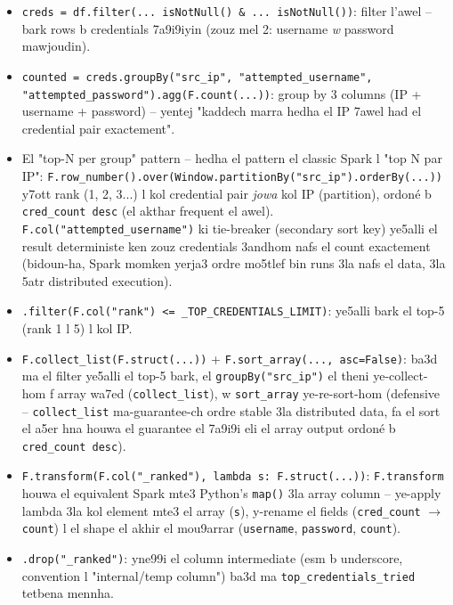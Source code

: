 \documentclass[11pt,a4paper]{report}
\DeclareRobustCommand{\code}[1]{\texttt{#1}}
\begin{document}
\begin{itemize}
  \item \code{creds = df.filter(... isNotNull() \& ... isNotNull())}:
        filter l'awel -- bark rows b credentials 7a9i9iyin (zouz mel 2:
        username \emph{w} password mawjoudin).
  \item \code{counted = creds.groupBy("src\_ip", "attempted\_username",
        "attempted\_password").agg(F.count(...))}: group by 3 columns
        (IP + username + password) -- yentej "kaddech marra hedha el IP
        7awel had el credential pair exactement".
  \item El "top-N per group" pattern -- hedha el pattern el classic Spark
        l "top N par IP": \code{F.row\_number().over(Window.partitionBy("src\_ip").orderBy(...))}
        y7ott rank (1, 2, 3...) l kol credential pair \emph{jowa} kol IP
        (partition), ordoné b \code{cred\_count desc} (el akthar frequent
        el awel). \code{F.col("attempted\_username")} ki tie-breaker
        (secondary sort key) ye5alli el result deterministe ken zouz
        credentials 3andhom nafs el count exactement (bidoun-ha, Spark
        momken yerja3 ordre mo5tlef bin runs 3la nafs el data, 3la 5atr
        distributed execution).
  \item \code{.filter(F.col("rank") <= \_TOP\_CREDENTIALS\_LIMIT)}: ye5alli
        bark el top-5 (rank 1 l 5) l kol IP.
  \item \code{F.collect\_list(F.struct(...))} + \code{F.sort\_array(...,
        asc=False)}: ba3d ma el filter ye5alli el top-5 bark, el
        \code{groupBy("src\_ip")} el theni ye-collect-hom f array wa7ed
        (\code{collect\_list}), w \code{sort\_array} ye-re-sort-hom
        (defensive -- \code{collect\_list} ma-guarantee-ch ordre stable
        3la distributed data, fa el sort el a5er hna houwa el guarantee
        el 7a9i9i eli el array output ordoné b \code{cred\_count desc}).
  \item \code{F.transform(F.col("\_ranked"), lambda s: F.struct(...))}:
        \code{F.transform} houwa el equivalent Spark mte3 Python's
        \code{map()} 3la array column -- ye-apply lambda 3la kol element
        mte3 el array (\code{s}), y-rename el fields (\code{cred\_count}
        $\to$ \code{count}) l el shape el akhir el mou9arrar
        (\code{username}, \code{password}, \code{count}).
  \item \code{.drop("\_ranked")}: yne99i el column intermediate (esm
        b underscore, convention l "internal/temp column") ba3d ma
        \code{top\_credentials\_tried} tetbena mennha.
\end{itemize}
\end{document}
